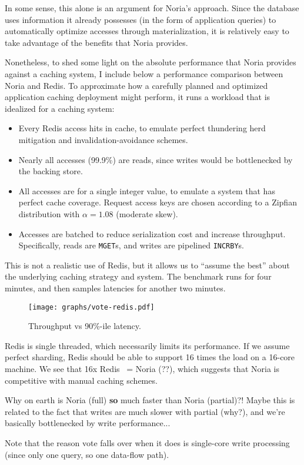 In some sense, this alone is an argument for Noria's approach. Since the
database uses information it already possesses (in the form of
application queries) to automatically optimize accesses through
materialization, it is relatively easy to take advantage of the benefits
that Noria provides.

Nonetheless, to shed some light on the absolute performance that Noria
provides against a caching system, I include below a performance
comparison between Noria and Redis. To approximate how a carefully
planned and optimized application caching deployment might perform, it
runs a workload that is idealized for a caching system:

\begin{itemize}
 \item Every Redis access hits in cache, to emulate perfect thundering herd
   mitigation and invalidation-avoidance schemes.
 \item Nearly all accesses (99.9\%) are reads, since writes would be
   bottlenecked by the backing store.
 \item All accesses are for a single integer value, to emulate a system that has
   perfect cache coverage. Request access keys are chosen according to a Zipfian
    distribution with $\alpha = 1.08$ (moderate skew).
 \item Accesses are batched to reduce serialization cost and increase
   throughput. Specifically, reads are \texttt{MGET}s, and writes are pipelined
    \texttt{INCRBY}s.
\end{itemize}

This is not a realistic use of Redis, but it allows us to ``assume the best''
about the underlying caching strategy and system. The benchmark runs for four
minutes, and then samples latencies for another two minutes.

\begin{figure}[h]
  \centering
  \texttt{[image: graphs/vote-redis.pdf]}
  \caption{Throughput vs 90\%-ile latency.}
  \label{f:vote-redis}
\end{figure}

Redis is single threaded, which necessarily limits its performance. If we assume
perfect sharding, Redis should be able to support 16 times the load on a 16-core
machine. We see that 16x Redis ~= Noria (??), which suggests that Noria is
competitive with manual caching schemes.

\begin{inprogress}
  Why on earth is Noria (full) \textbf{so} much faster than Noria (partial)?!
  Maybe this is related to the fact that writes are much slower with partial
  (why?), and we're basically bottlenecked by write performance...
\end{inprogress}

\begin{inprogress}
  Note that the reason vote falls over when it does is single-core write
  processing (since only one query, so one data-flow path).
\end{inprogress}
